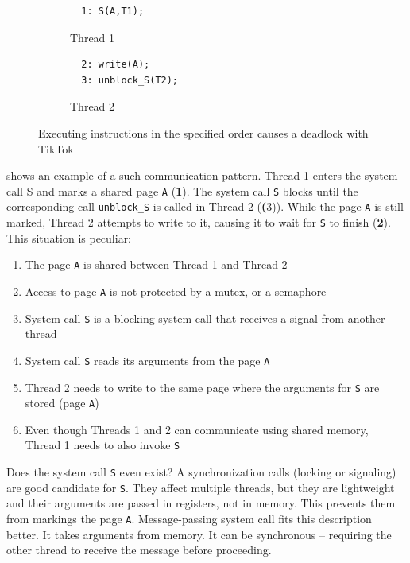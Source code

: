 \begin{figure}
  \centering
  \begin{subfigure}[b]{0.45\linewidth}
  \begin{minipage}{\linewidth}
  \begin{lstlisting}
  1: S(A,T1);  
  \end{lstlisting}
  \end{minipage}
  \caption{Thread 1}
  \end{subfigure}
  \hfill
  \begin{subfigure}[b]{0.45\linewidth}
  \begin{minipage}{\linewidth}
  \begin{lstlisting}
  2: write(A);
  3: unblock_S(T2);
  \end{lstlisting}  
  \end{minipage}
  \caption{Thread 2}
  \end{subfigure}
  \caption{Executing instructions in the specified order causes a deadlock with TikTok}
  \label{fig:deadlock}
\end{figure}


 shows an example of a such communication pattern. Thread 1
enters the system call S and marks a shared page \texttt{A} (\textbf{1}). The
system call \texttt{S} blocks until the corresponding call \texttt{unblock\_S} is called
in Thread 2 (\textbf(3)). While the page \texttt{A} is still marked, Thread 2
attempts to write to it, causing it to wait for \texttt{S} to finish
(\textbf{2}). This situation is peculiar:

\begin{enumerate}
    \item The page \texttt{A} is shared between Thread 1 and Thread 2
    \item Access to page \texttt{A} is not protected by a mutex, or a semaphore
    \item System call \texttt{S} is a blocking system call that receives a 
    signal from another thread
    \item System call \texttt{S} reads its arguments from the page \texttt{A}
    \item Thread 2 needs to write to the same page where the arguments for 
    \texttt{S} are stored (page \texttt{A})
    \item Even though Threads 1 and 2 can communicate using shared memory, 
    Thread 1 needs to also invoke \texttt{S}
\end{enumerate}

Does the system call \texttt{S} even exist? A synchronization calls (locking or
signaling) are good candidate for \texttt{S}. They affect multiple threads, but
they are lightweight and their arguments are passed in registers, not in memory.
This prevents them from markings the page \texttt{A}. Message-passing system call
fits this description better. It takes arguments from memory. It can be
synchronous -- requiring the other thread to receive the message before
proceeding.

